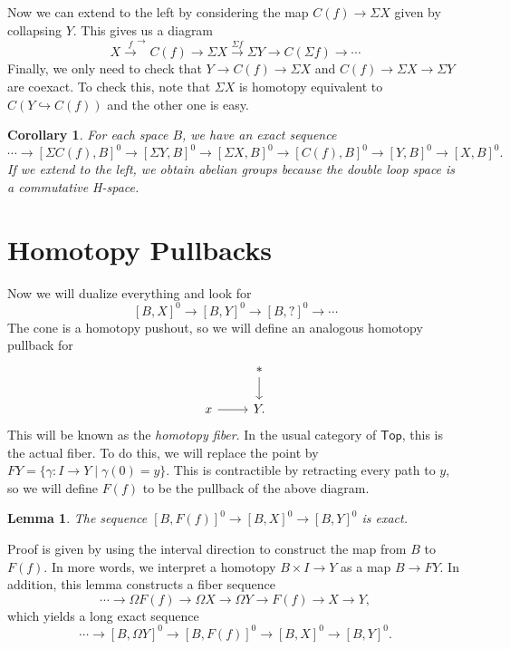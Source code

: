 \documentclass[leqno, openany]{memoir}
\newtheorem{cor}[thm]{Corollary}
\newtheorem{lem}[thm]{Lemma}
\theoremstyle{definition}
\theoremstyle{remark}
\theoremstyle{plain}
\theoremstyle{definition}
\theoremstyle{remark}
\newcommand{\ms}[1]{\mathsf{#1}}
\begin{document}
Now we can extend to the left by considering the map $C(f) \to \Sigma X$ given by collapsing $Y$. This gives us a diagram
\[ X \xrightarrow{f} ^ \to C(f) \to \Sigma X \xrightarrow{\Sigma f} \Sigma Y \to C(\Sigma f) \to \cdots \]
Finally, we only need to check that $Y \to C(f) \to \Sigma X$ and $C(f) \to \Sigma X \to \Sigma Y$ are coexact. To check this, note that $\Sigma X$ is homotopy equivalent to $C(Y \hookrightarrow C(f))$ and the other one is easy.

\begin{cor}
    For each space $B$, we have an exact sequence
    \[ \cdots \to [\Sigma C(f),B]^0 \to [\Sigma Y, B]^0 \to [\Sigma X,B]^0 \to [C(f),B]^0 \to [Y,B]^0 \to [X,B]^0. \]
    If we extend to the left, we obtain \textit{abelian groups} because the double loop space is a commutative H-space. 
\end{cor}

\section{Homotopy Pullbacks}%
\label{sec:homotopy_pullbacks}

Now we will dualize everything and look for
\[ [B,X]^0 \to [B,Y]^0 \to [B,?]^0 \to \cdots \]
The cone is a homotopy pushout, so we will define an analogous homotopy pullback for
\begin{equation}
\begin{tikzcd}
    & * \arrow{d} \\
    x \arrow{r} & Y.
\end{tikzcd}
\end{equation}
This will be known as the \textit{homotopy fiber}. In the usual category of $\ms{Top}$, this is the actual fiber. To do this, we will replace the point by $F Y = \{ \gamma: I \to Y \mid \gamma(0) = y \}$. This is contractible by retracting every path to $y$, so we will define $F(f)$ to be the pullback of the above diagram.

\begin{lem}
    The sequence $[B,F(f)]^0 \to [B,X]^0 \to [B,Y]^0$ is exact.
\end{lem}

Proof is given by using the interval direction to construct the map from $B$ to $F(f)$. In more words, we interpret a homotopy $B \times I \to Y$ as a map $B \to FY$. In addition, this lemma constructs a fiber sequence
\[ \cdots \to \Omega F(f) \to \Omega X \to \Omega Y \to F(f) \to X \to Y, \]
which yields a long exact sequence
\[ \cdots \to [B, \Omega Y]^0 \to [B,F(f)]^0 \to [B,X]^0 \to [B,Y]^0. \]
\end{document}
